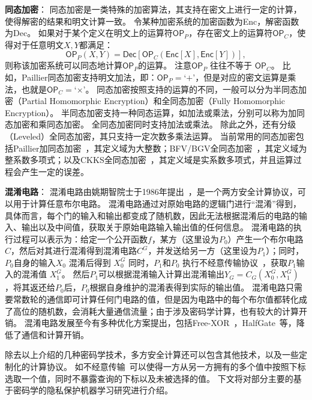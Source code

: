 \textbf{同态加密}：
同态加密是一类特殊的加密算法，其支持在密文上进行一定的计算，使得解密的结果和明文计算一致。
%
令某种加密系统的加密函数为\textsf{Enc}，解密函数为\textsf{Dec}。
%
如果对于某个定义在明文上的运算符$\mathsf{OP}_P$，存在密文上的运算符$\mathsf{OP}_C$，使得对于任意明文$X, Y$都满足：
\begin{equation}
    \textsf{OP}_P(X, Y) = \mathsf{Dec}[\mathsf{OP}_C (\mathsf{Enc}[X], \mathsf{Enc}[Y])],
\end{equation}
%
则称该加密系统可以同态地计算$\mathsf{OP}_P$的运算。
%
注意$\mathsf{OP}_P$ 往往不等于 $\mathsf{OP}_C$。
比如，Paillier同态加密支持明文加法，即：$\mathsf{OP}_P=$`$+$'，但是对应的密文运算是乘法，也就是$\mathsf{OP}_C=$`$\times$'。
%
同态加密按照支持的运算的不同，一般可以分为半同态加密（Partial Homomorphic Encryption）和全同态加密（Fully Homomorphic Encryption）。
%
半同态加密支持一种同态运算，如加法或乘法，分别可以称为加同态加密和乘同态加密。
%
全同态加密同时支持加法或乘法。
%
除此之外，还有分级（Leveled）全同态加密，其只支持一定次数多乘法运算。
%
当前常用的同态加密包括Paillier加同态加密~\cite{paillier1999}，其定义域为大整数；BFV/BGV全同态加密~\cite{2012bfv1,2012bfv2,2014bgv}，其定义域为整系数多项式；以及CKKS全同态加密~\cite{ckks2017}，其定义域是实系数多项式，并且运算过程会产生一定的误差。


\textbf{混淆电路}：
混淆电路由姚期智院士于1986年提出~\cite{yao1986gc}，是一个两方安全计算协议，可以用于计算任意布尔电路。
%
混淆电路通过对原始电路的逻辑门进行“混淆”得到，具体而言，每个门的输入和输出都变成了随机数，因此无法根据混淆后的电路的输入、输出以及中间值，获取关于原始电路输入输出值的任何信息。
%
混淆电路的执行过程可以表示为：给定一个公开函数$f$，某方（这里设为$P_0$）产生一个布尔电路$C$，然后对其进行混淆得到混淆电路$C^G$，并发送给另一方（这里设为$P_1$）；同时，$P_0$自身的输入$X_0$ 混淆后得到 $X_0^G$
%
同时，$P_1$和$P_0$ 执行不经意传输协议~\cite{yadav_2022_ot_survey}，获取$P_1$输入的混淆值 $X_1^G$。
%
然后$P_1$可以根据混淆输入计算出混淆输出$Y_G = C_G(X_0^G, X_1^G)$，将其返还给$P_0$后，$P_0$根据自身维护的混淆表得到实际的输出值。
%
混淆电路只需要常数轮的通信即可计算任何门电路的值，但是因为电路中的每个布尔值都转化成了高位的随机数，会消耗大量通信流量；由于涉及密码学计算，也有较大的计算开销。
%
混淆电路发展至今有多种优化方案提出，包括Free-XOR~\cite{kolesnikov2008free_xor}，HalfGate~\cite{zahur2015halfgate}等，降低了通信和计算开销。
%

除去以上介绍的几种密码学技术，多方安全计算还可以包含其他技术，以及一些定制化的计算协议。
如不经意传输~\cite{yadav_2022_ot_survey,chou_2015_simplest_ot}可以使得一方从另一方拥有的多个值中按照下标选取一个值，同时不暴露查询的下标以及未被选择的值。
%
下文将对部分主要的基于密码学的隐私保护机器学习研究进行介绍。


